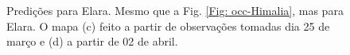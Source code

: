 \documentclass[12pt,a4paper]{monografia}
\begin{document}
\begin{figure}
\begin{centering}
\caption{Predições para Elara. Mesmo que a Fig. \ref{Fig: occ-Himalia}, mas para Elara. O mapa (c) feito a partir de observações tomadas dia 25 de março e (d) a partir de 02 de abril.}
\label{Fig: occ-Elara}
\end{centering}
\end{figure}
\end{document}
